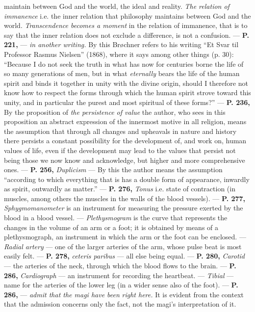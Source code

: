 \documentclass[12pt,a4paper,openany]{book}
\newcommand{\opage}[1]{\marginnote{\footnotesize\textit{[#1]}}}
\begin{document}
\setcounter{footnote}{0}%
\opage{306}maintain between God and the world, the ideal and reality. \textit{The relation of immanence}
i.e. the inner relation that philosophy maintains between God and the world.
\textit{Transcendence becomes a moment} in the relation of immanence, that is to say that the
inner relation does not exclude a difference, is not a confusion.
--- \textbf{P. 221,} --- \textit{in another writing.} By this Brøchner refers to his writing
``Et Svar til Professor Rasmus Nielsen'' (1868), where it says among other things
(p. 30): ``Because I do not seek the truth in what has now for centuries
borne the life of so many generations of men, but in what \textit{eternally} bears
the life of the human spirit and binds it together in unity with the divine
origin, should I therefore not know how to respect the forms
through which the human spirit strove toward this unity, and
in particular the purest and most spiritual of these forms?'' --- \textbf{P. 236,} By %
the proposition of \textit{the persistence of value} the author, who sees in this proposition
an abstract expression of the innermost motive in all religion, means the assumption
that through all changes and upheavals in nature and
history there persists a constant possibility for the development of, and work on,
human values of life, even if the development may lead to the values
that persist not being those we now know and acknowledge, but higher and
more comprehensive ones. --- \textbf{P. 256,} \textit{Duplicism} --- By this the author means
the assumption ``according to which everything that is has a double form of appearance,
inwardly as spirit, outwardly as matter.'' --- \textbf{P. 276,}
\textit{Tonus} i.e. state of contraction (in muscles, among others the muscles in
the walls of the blood vessels). --- \textbf{P. 277,} \textit{Sphygmomanometer} is an instrument for
measuring the pressure exerted by the blood in a blood vessel. --- \textit{Plethysmogram} is the
curve that represents the changes in the volume of an arm or a foot;
it is obtained by means of a plethysmograph, an instrument in which the arm or
the foot can be enclosed. --- \textit{Radial artery} --- one of the larger arteries of the arm,
whose pulse beat is most easily felt. --- \textbf{P. 278,} \textit{ceteris paribus} --- all else being equal.
--- \textbf{P. 280,} \textit{Carotid} --- the arteries of the neck, through which the blood flows to
the brain. --- \textbf{P. 286,} \textit{Cardiograph} --- an instrument for recording the heartbeat. %
--- \textit{Tibial} --- name for the arteries of the lower leg (in a wider sense also
of the foot). --- \textbf{P. 286,} --- \textit{admit that the magi have been}
\textit{right here.} It is evident from the context that the admission concerns only the fact,
not the magi's interpretation of it.
\end{document}
